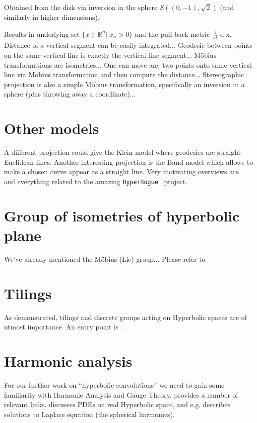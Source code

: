 Obtained from the disk via inversion in the sphere \( S((0, -1), \sqrt{2}) \)
(and similarly in higher dimensions).


Results in underlying set \( \{ x\in\mathbb{R}^n \left|~x_n > 0\right.\} \)
and the pull-back metric \( \frac{1}{x_n^2} \operatorname{d}\mathrm{x} \).
Distance of a vertical segment can be easily integrated...
Geodesic between points on the same vertical line is exactly the vertical line segment...
M\"obius transformations are isometries...
One can move any two points onto same vertical line via M\"obius transformation
and then compute the distance...
Stereographic projection is also a simple M\"obius transformation, specifically
an inversion in a sphere (plus throwing away a coordinate)...

\section{Other models}

A different projection could give the Klein model where geodesics are straight
Euclidean lines. Another interesting projection is the Band model which allows
to make a chosen curve appear as a straight line. Very motivating overviews
are~\citet{bulatovConformal} and everything related to the amazing
\texttt{HyperRogue}~\cite{hyperrogue} project.

\section*{Group of isometries of hyperbolic plane}

We've already mentioned the M\"obius (Lie) group...
Please refer to~\cite{beardonGeometryDiscrete,hubbardTeichmuller}

\section{Tilings}

As \citet{yaSaTilingBased} demonstrated, tilings and discrete groups acting on
Hyperbolic spaces are of utmost importance. An entry point is~\citet{gromov}.


\section{Harmonic analysis}

For our further work on ``hyperbolic convolutions'' we need to gain some
familiarity with Harmonic Analysis and Gauge Theory.
 provides a number of relevant links.
\citet{stollharmonic} discusses PDEs on real Hyperbolic space, and e.g.
describes solutions to Laplace equation (the spherical harmonics).


